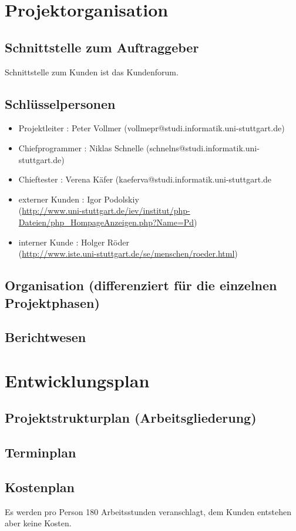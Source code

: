 \documentclass[a4paper,10pt]{scrartcl}
\begin{document}
\section{Projektorganisation}
\subsection{Schnittstelle zum Auftraggeber}
Schnittstelle zum Kunden ist das Kundenforum. 
\subsection{Schlüsselpersonen}
\begin{itemize}
\item[]
Projektleiter : Peter Vollmer (vollmepr@studi.informatik.uni-stuttgart.de)
\item[]
Chiefprogrammer : Niklas Schnelle (schnelns@studi.informatik.uni-stuttgart.de)
\item[]
Chieftester : Verena Käfer (kaeferva@studi.informatik.uni-stuttgart.de
\item
externer Kunden : Igor Podolskiy\\
(\href{http://www.uni-stuttgart.de/iev/institut/php-Dateien/php_HompageAnzeigen.php?Name=Pd}{http://www.uni-stuttgart.de/iev/institut/php-Dateien/php\_HompageAnzeigen.php?Name=Pd})
\item[]
interner Kunde : Holger Röder\\
(\href{http://www.iste.uni-stuttgart.de/se/menschen/roeder.html}{http://www.iste.uni-stuttgart.de/se/menschen/roeder.html})
\end{itemize}
\subsection{Organisation (differenziert für die einzelnen Projektphasen)}
\subsection{Berichtwesen}

\section{Entwicklungsplan}
\subsection{Projektstrukturplan (Arbeitsgliederung)}
\subsection{Terminplan}
\subsection{Kostenplan}
Es werden pro Person 180 Arbeitsstunden veranschlagt, dem Kunden entstehen aber keine Kosten.
\end{document}

